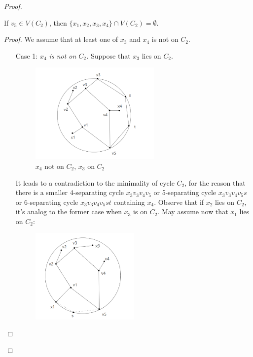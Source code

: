 \begin{proof}
\begin{itemize}
\begin{lemma}
If $v_5 \in V(C_2)$, then $\{x_1, x_2, x_3, x_4\} \cap V(C_2) = \emptyset$.
\end{lemma}
\begin{proof}
We assume that at least one of $x_3$ and $x_4$ is not on $C_2$.
\begin{itemize}
    \item[Case 1:] \textit{\textit{$x_4$ is not on $C_2$.}} Suppose that $x_3$ lies on $C_2$. \begin{figure}[H] %
    \centering %
    \includegraphics[width=0.6\textwidth]{figure/x4notonc2.png} 
    \caption{$x_4$ not on $C_2$, $x_3$ on $C_2$} %
    \label{figure} %
    \end{figure}
    It leads to a contradiction to the minimality of cycle $C_2$, for the reason that there is a smaller 4-separating cycle $x_3v_3v_4v_5$ or 5-separating cycle $x_3v_3v_4v_5s$ or 6-separating cycle $x_3v_3v_4v_5st$ containing $x_4$. Observe that if $x_2$ lies on $C_2$, it's analog to the former case when $x_3$ is on $C_2$. May assume now that $x_1$ lies on $C_2$:
    \begin{figure}[H] %
    \centering %
    \includegraphics[width=0.5\textwidth]{figure/x1notonc2.png} 

\end{figure}
\end{itemize}
\end{proof}
\end{itemize}
\end{proof}
